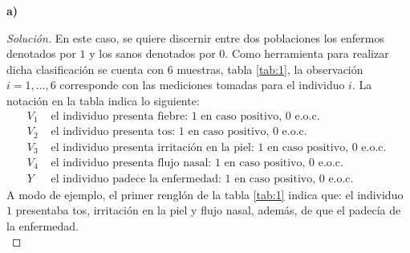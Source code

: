 \documentclass[10.5pt,notitlepage]{article}
\newenvironment{solucion}
  {\begin{proof}[Solución]}
  {\end{proof}}
\theoremstyle{plain}
\begin{document}
\textbf{a)}
\begin{solucion}
En este caso, se quiere discernir entre dos poblaciones los enfermos denotados por \(1\) y los sanos denotados por \(0\). Como herramienta para realizar dicha clasificación se cuenta con 6 muestras, tabla \ref{tab:1}, la observación \(i = 1,\hdots, 6\) corresponde con las mediciones tomadas para el individuo \(i\). La notación en la tabla indica lo siguiente: 
\begin{align*}
      V_1& \text{ el individuo presenta fiebre: } 1 \text{ en caso positivo, } 0 \text{ e.o.c. }\\ 
      V_2& \text{ el individuo presenta tos: } 1 \text{ en caso positivo, } 0 \text{ e.o.c. }\\
      V_3& \text{ el individuo presenta irritación en la piel: } 1 \text{ en caso positivo, } 0 \text{ e.o.c. }\\
      V_4& \text{ el individuo presenta flujo nasal: } 1 \text{ en caso positivo, } 0 \text{ e.o.c. }\\
      Y& \text{ el individuo padece la enfermedad: } 1 \text{ en caso positivo, } 0 \text{ e.o.c. }
\end{align*}
A modo de ejemplo, el primer renglón de la tabla \ref{tab:1} indica que: el individuo \(1\) presentaba tos, irritación en la piel y flujo nasal, además, de que el padecía de la enfermedad.\\ 


\end{solucion}
\end{document}
